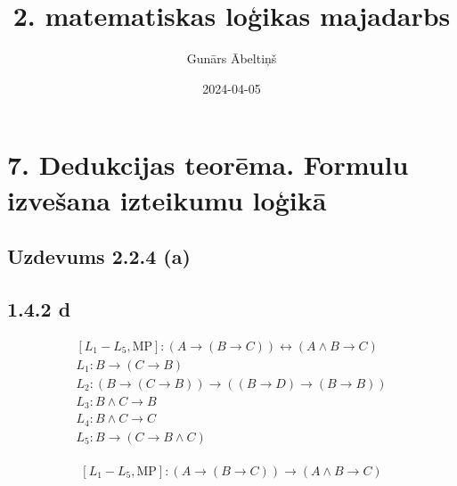 \documentclass{article}
\title{2. matematiskas loģikas majadarbs}
\author{Gunārs Ābeltiņš}
\date{2024-04-05}
\begin{document}
\maketitle

\section*{7. Dedukcijas teorēma. Formulu izvešana izteikumu loģikā}

\subsection*{Uzdevums 2.2.4 (a)}

\subsection*{1.4.2 d}

\[
    \begin{array}{l}
        [L_1 - L_5, \text{MP}]: (A \rightarrow (B \rightarrow C)) \leftrightarrow (A \land B \rightarrow C)  \\
        L_1: B \rightarrow (C \rightarrow B)                                                                 \\
        L_2: (B \rightarrow (C \rightarrow B)) \rightarrow ((B \rightarrow D) \rightarrow (B \rightarrow B)) \\
        L_3: B \land C \rightarrow B                                                                         \\
        L_4: B \land C \rightarrow C                                                                         \\
        L_5: B \rightarrow (C \rightarrow B \land C)                                                         \\
    \end{array}
\]

\[
    [L_1 - L_5, \text{MP}]: (A \rightarrow (B \rightarrow C)) \rightarrow (A \land B \rightarrow C)
\]
\end{document}
